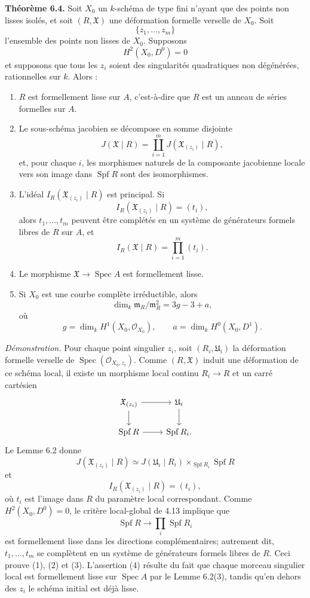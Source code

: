\documentclass[11pt]{article}
\providecommand{\Spec}{\operatorname{Spec}}
\providecommand{\Spf}{\operatorname{Spf}}
\providecommand{\Oo}{\mathcal O}
\begin{document}
\textbf{Théorème 6.4.}  Soit \(X_0\) un \(k\)-schéma de type fini n'ayant que des points non lisses isolés, et soit \((R,\mathfrak X)\) une déformation formelle verselle de \(X_0\).  Soit
\[
        \{z_1,\ldots,z_m\}
\]
l'ensemble des points non lisses de \(X_0\).  Supposons
\[
        H^2(X_0,D^0)=0
\]
et supposons que tous les \(z_i\) soient des singularités quadratiques non dégénérées, rationnelles sur \(k\).  Alors :
\begin{enumerate}[label=(\arabic*)]
\item \(R\) est formellement lisse sur \(A\), c'est-à-dire que \(R\) est un anneau de séries formelles sur \(A\).
\item Le sous-schéma jacobien se décompose en somme disjointe
\[
        J(\mathfrak X\mid R)
        =
        \coprod_{i=1}^m J(\mathfrak X_{(z_i)}\mid R),
\]
et, pour chaque \(i\), les morphismes naturels de la composante jacobienne locale vers son image dans \(\Spf R\) sont des isomorphismes.
\item L'idéal \(I_R(\mathfrak X_{(z_i)}\mid R)\) est principal.  Si
\[
        I_R(\mathfrak X_{(z_i)}\mid R)=(t_i),
\]
alors \(t_1,\ldots,t_m\) peuvent être complétés en un système de générateurs formels libres de \(R\) sur \(A\), et
\[
        I_R(\mathfrak X\mid R)=\prod_{i=1}^m(t_i).
\]
\item Le morphisme \(\mathfrak X\to\Spec A\) est formellement lisse.
\item Si \(X_0\) est une courbe complète irréductible, alors
\[
        \dim_k\mathfrak m_R/\mathfrak m_R^2
        =
        3g-3+a,
\]
où
\[
        g=\dim_k H^1(X_0,\Oo_{X_0}),
        \qquad
        a=\dim_k H^0(X_0,D^1).
\]
\end{enumerate}

\emph{Démonstration.}  Pour chaque point singulier \(z_i\), soit \((R_i,\mathfrak U_i)\) la déformation formelle verselle de \(\Spec(\Oo_{X_0,z_i})\).  Comme \((R,\mathfrak X)\) induit une déformation de ce schéma local, il existe un morphisme local continu \(R_i\to R\) et un carré cartésien
\[
\begin{tikzcd}
\mathfrak X_{(z_i)} \arrow[r] \arrow[d] &
\mathfrak U_i \arrow[d]\\
\Spf R \arrow[r] & \Spf R_i .
\end{tikzcd}
\]
Le Lemme 6.2 donne
\[
        J(\mathfrak X_{(z_i)}\mid R)
        \simeq
        J(\mathfrak U_i\mid R_i)\times_{\Spf R_i}\Spf R
\]
et
\[
        I_R(\mathfrak X_{(z_i)}\mid R)=(t_i),
\]
où \(t_i\) est l'image dans \(R\) du paramètre local correspondant.  Comme \(H^2(X_0,D^0)=0\), le critère local-global de 4.13 implique que
\[
        \Spf R\longrightarrow \prod_i\Spf R_i
\]
est formellement lisse dans les directions complémentaires; autrement dit, \(t_1,\ldots,t_m\) se complètent en un système de générateurs formels libres de \(R\).  Ceci prouve (1), (2) et (3).  L'assertion (4) résulte du fait que chaque morceau singulier local est formellement lisse sur \(\Spec A\) par le Lemme 6.2(3), tandis qu'en dehors des \(z_i\) le schéma initial est déjà lisse.
\end{document}

